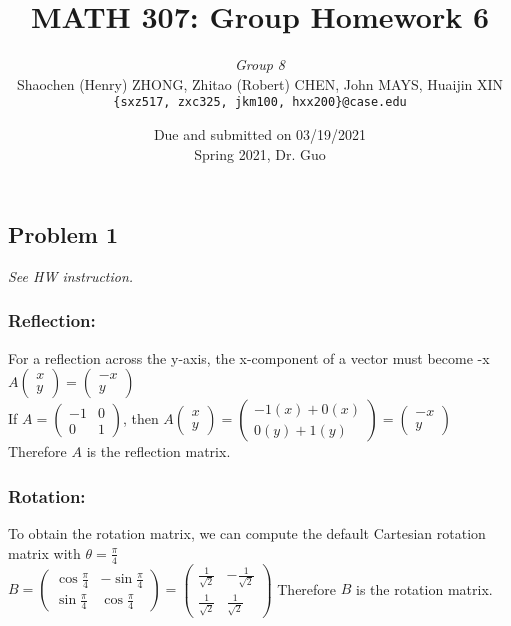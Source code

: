 \documentclass[11pt]{article}
\newcommand{\ilc}{\texttt}
\begin{document}
\title{\textbf{MATH 307: Group Homework 6}}


\author{\textit{Group 8}\\
Shaochen (Henry) ZHONG, Zhitao (Robert) CHEN, John MAYS, Huaijin XIN\\ \ilc{\{sxz517, zxc325, jkm100, hxx200\}@case.edu}}

\date{Due and submitted on 03/19/2021 \\ Spring 2021, Dr. Guo}
\maketitle




\subsection*{Problem 1}
\textit{See HW instruction.}\newline
\subsubsection*{Reflection: }
For a reflection across the y-axis, the x-component of a vector must become -x\\
$A\begin{pmatrix}x\\ y\end{pmatrix} = \begin{pmatrix}-x\\ y\end{pmatrix}$\\
If $A = \begin{pmatrix}-1 & 0\\ 0 & 1\end{pmatrix}$, then $A\begin{pmatrix}x\\ y\end{pmatrix}=\begin{pmatrix}-1(x)+0(x)\\ 0(y)+1(y)\end{pmatrix}=\begin{pmatrix}-x\\ y\end{pmatrix}$\\
Therefore $A$ is the reflection matrix.
\subsubsection*{Rotation: }
To obtain the rotation matrix, we can compute the default Cartesian rotation matrix with $\theta = \frac{\pi}{4}$\\
$B=\begin{pmatrix}\cos{\frac{\pi}{4}} & -\sin{\frac{\pi}{4}}\\ \sin{\frac{\pi}{4}} & \cos{\frac{\pi}{4}}\ \end{pmatrix}=\begin{pmatrix}\frac{1}{\sqrt{2}} & -\frac{1}{\sqrt{2}}\\ \frac{1}{\sqrt{2}} & \frac{1}{\sqrt{2}} \end{pmatrix}$
Therefore $B$ is the rotation matrix.
\end{document}
